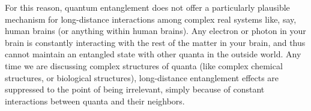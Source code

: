 \documentclass[onecolumn,preprintnumbers,amsmath,amssymbn,reprint,nofootinbib,superscriptaddress]{revtex4}    %
\begin{document}
For this reason, quantum entanglement does not offer a particularly plausible mechanism for long-distance interactions among complex real systems like, say, human brains (or anything within human brains).  Any electron or photon in your brain is constantly interacting with the rest of the matter in your brain, and thus cannot maintain an entangled state with other quanta in the outside world.  Any time we are discussing complex structures of quanta (like complex chemical structures, or biological structures), long-distance entanglement effects are suppressed to the point of being irrelevant, simply because of constant interactions between quanta and their neighbors.

\end{document}
